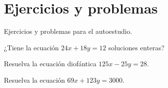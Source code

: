 \documentclass[12pt]{article}
\begin{document}
    \section{Ejercicios y problemas}

    Ejercicios y problemas para el autoestudio.

    \begin{exercise}
        ¿Tiene la ecuación $24x + 18y = 12$ soluciones enteras?
    \end{exercise}

    \begin{exercise}
        Resuelva la ecuación diofántica $125x - 25y = 28.$
    \end{exercise}

    \begin{exercise}
        Resuelva la ecuación $69x + 123y = 3000.$
    \end{exercise}
\end{document}
